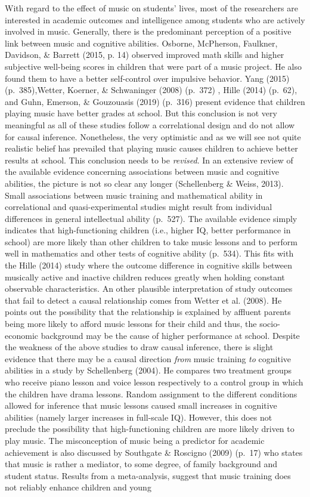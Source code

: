 \documentclass[a4, 12pt]{article}
\begin{document}
\label{sec:literature_review}
With regard to the effect of music on students' lives, most of the researchers are interested in academic outcomes and intelligence among students who are actively involved in music. Generally, there is the predominant perception of a positive link between music and cognitive abilities. Osborne, McPherson, Faulkner, Davidson, \& Barrett (2015, p. 14) observed improved math skills and higher subjective well-being scores in children that were part of a music project. He also found them to have a better self-control over impulsive behavior. Yang (2015) (p.~385),Wetter, Koerner, \& Schwaninger (2008) (p.~372) , Hille (2014) (p.~62), and Guhn, Emerson, \& Gouzouasis (2019) (p.~316) present evidence that children playing music have better grades at school. But this conclusion is not very meaningful as all of these studies follow a correlational design and do not allow for causal inference. Nonetheless, the very optimistic and as we will see not quite realistic belief has prevailed that playing music causes children to achieve better results at school. This conclusion needs to be \emph{revised}. In an extensive review of the available evidence concerning associations between music and cognitive abilities, the picture is not so clear any longer (Schellenberg \& Weiss, 2013). Small associations between music training and mathematical ability in correlational and quasi-experimental studies might result from individual differences in general intellectual ability (p.~527). The available evidence simply indicates that high-functioning children (i.e., higher IQ, better performance in school) are more likely than other children to take music lessons and to perform well in mathematics and other tests of cognitive ability (p.~534). This fits with the Hille (2014) study where the outcome difference in cognitive skills between musically active and inactive children reduces greatly when holding constant observable characteristics. An other plausible interpretation of study outcomes that fail to detect a causal relationship comes from Wetter et al. (2008). He points out the possibility that the relationship is explained by affluent parents being more likely to afford music lessons for their child and thus, the socio-economic background may be the cause of higher performance at school. Despite the weakness of the above studies to draw causal inference, there is slight evidence that there may be a causal direction \emph{from} music training \emph{to} cognitive abilities in a study by Schellenberg (2004). He compares two treatment groups who receive piano lesson and voice lesson respectively to a control group in which the children have drama lessons. Random assignment to the different conditions allowed for inference that music lessons caused small increases in cognitive abilities (namely larger increases in full-scale IQ). However, this does not preclude the possibility that high-functioning children are more likely driven to play music. The misconception of music being a predictor for academic achievement is also discussed by Southgate \& Roscigno (2009) (p.~17) who states that music is rather a mediator, to some degree, of family background and student status. Results from a meta-analysis, suggest that music training does not reliably enhance children and young 
\end{document}
